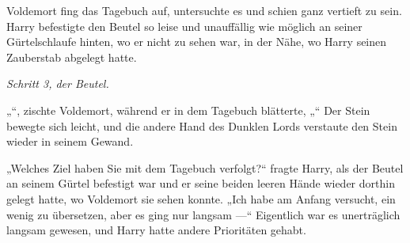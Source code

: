 Voldemort fing das Tagebuch auf, untersuchte es und schien ganz vertieft zu sein.
Harry befestigte den Beutel so leise und unauffällig wie möglich an seiner Gürtelschlaufe hinten, wo er nicht zu sehen war, in der Nähe, wo Harry seinen Zauberstab abgelegt hatte.

\emph{Schritt 3, der Beutel.}

„“, zischte Voldemort, während er in dem Tagebuch blätterte, „“
Der Stein bewegte sich leicht, und die andere Hand des Dunklen Lords verstaute den Stein wieder in seinem Gewand.

„Welches Ziel haben Sie mit dem Tagebuch verfolgt?“ fragte Harry, als der Beutel an seinem Gürtel befestigt war und er seine beiden leeren Hände wieder dorthin gelegt hatte, wo Voldemort sie sehen konnte.
„Ich habe am Anfang versucht, ein wenig zu übersetzen, aber es ging nur langsam —“
Eigentlich war es unerträglich langsam gewesen, und Harry hatte andere Prioritäten gehabt.


